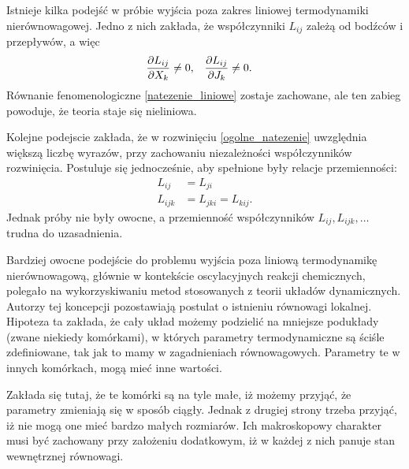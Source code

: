 \documentclass[10pt, a4paper, twoside, onecolumn]{article}
\numberwithin{equation}{section}
\begin{document}
	Istnieje kilka podejść w próbie wyjścia poza zakres liniowej termodynamiki nierównowagowej. Jedno z nich zakłada, że współczynniki \(L_{ij}\) zależą od bodźców i przepływów, a więc
	\begin{align}
		& \pdv{L_{ij}}{X_{k}}\neq 0, && \pdv{L_{ij}}{J_{k}}\neq 0.
	\end{align}
	Równanie fenomenologiczne \eqref{natezenie_liniowe} zostaje zachowane, ale ten zabieg powoduje, że teoria staje się nieliniowa. \par
	Kolejne podejscie zakłada, że w rozwinięciu \eqref{ogolne_natezenie} uwzględnia większą liczbę wyrazów, przy zachowaniu niezależności współczynników rozwinięcia. Postuluje się jednocześnie, aby spełnione były relacje przemienności:
	\begin{equation}
	\begin{split}
		L_{ij} &= L_{ji} \\
		L_{ijk} &= L_{jki} = L_{kij}.
	\end{split}
	\end{equation}
	Jednak próby nie były owocne, a przemienność współczynników \(L_{ij}, L_{ijk}, \ldots\) trudna do uzasadnienia. \par
	Bardziej owocne podejście do problemu wyjścia poza liniową termodynamikę nierównowagową, głównie w kontekście oscylacyjnych reakcji chemicznych, polegało na wykorzyskiwaniu metod stosowanych z teorii układów dynamicznych. Autorzy tej koncepcji pozostawiają postulat o istnieniu równowagi lokalnej. Hipoteza ta zakłada, że cały układ możemy podzielić na mniejsze podukłady (zwane niekiedy komórkami), w których parametry termodynamiczne są ściśle zdefiniowane, tak jak to mamy w zagadnieniach równowagowych. Parametry te w innych komórkach, mogą mieć inne wartości. \par
	Zakłada się tutaj, że te komórki są na tyle małe, iż możemy przyjąć, że parametry zmieniają się w sposób ciągły. Jednak z drugiej strony trzeba przyjąć, iż nie mogą one mieć bardzo małych rozmiarów. Ich makroskopowy charakter musi być zachowany przy założeniu dodatkowym, iż w każdej z nich panuje stan wewnętrznej równowagi. \par
	
\end{document}
